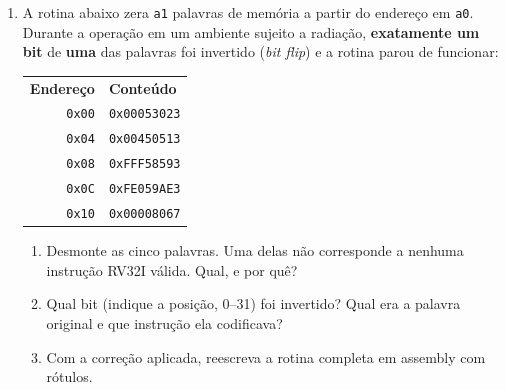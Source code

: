 \documentclass[11pt, a4paper]{article}
\begin{document}
\begin{enumerate}
\begin{enumerate}
  \item Calcule o deslocamento (em bytes) do \texttt{beq} e monte a instru\c{c}\~{a}o completa: mostre os campos \texttt{imm[12|10:5]}, \texttt{rs2}, \texttt{rs1}, \texttt{funct3}, \texttt{imm[4:1|11]} e \texttt{opcode}, e o valor final em hexadecimal.
  \item Fa\c{c}a o mesmo para o \texttt{jal zero, Loop} (deslocamento \textbf{negativo}): campos \texttt{imm[20|10:1|11|19:12]}, \texttt{rd}, \texttt{opcode} e o hexadecimal final.
  \item Qual o alcance m\'{a}ximo de um \texttt{beq}, em instru\c{c}\~{o}es de 32 bits? E de um \texttt{jal}?
  \item Suponha agora que o r\'{o}tulo \texttt{Achei} esteja a 3000 instru\c{c}\~{o}es de dist\^{a}ncia. O \texttt{beq} ainda alcan\c{c}a? Se n\~{a}o, reescreva o desvio condicional usando duas instru\c{c}\~{o}es, conforme visto em aula.
\end{enumerate}

\item A rotina abaixo zera \texttt{a1} palavras de mem\'{o}ria a partir do endere\c{c}o em \texttt{a0}. Durante a opera\c{c}\~{a}o em um ambiente sujeito a radia\c{c}\~{a}o, \textbf{exatamente um bit} de \textbf{uma} das palavras foi invertido (\emph{bit flip}) e a rotina parou de funcionar:

\begin{center}
\small
\begin{tabular}{rl}
\textbf{Endere\c{c}o} & \textbf{Conte\'{u}do}\\
\texttt{0x00} & \texttt{0x00053023}\\
\texttt{0x04} & \texttt{0x00450513}\\
\texttt{0x08} & \texttt{0xFFF58593}\\
\texttt{0x0C} & \texttt{0xFE059AE3}\\
\texttt{0x10} & \texttt{0x00008067}\\
\end{tabular}
\end{center}

\begin{enumerate}
  \item Desmonte as cinco palavras. Uma delas n\~{a}o corresponde a nenhuma instru\c{c}\~{a}o RV32I v\'{a}lida. Qual, e por qu\^{e}?
  \item Qual bit (indique a posi\c{c}\~{a}o, 0--31) foi invertido? Qual era a palavra original e que instru\c{c}\~{a}o ela codificava?
  \item Com a corre\c{c}\~{a}o aplicada, reescreva a rotina completa em assembly com r\'{o}tulos.
\end{enumerate}


\end{enumerate}
\end{document}
